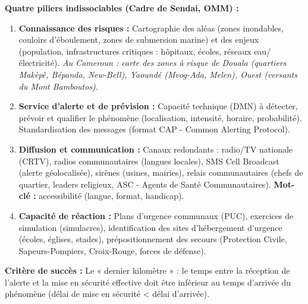\documentclass[11pt]{article}
\newcommand{\cle}[1]{{\popxbold\color{popdark}#1}}
\begin{document}
\begin{methode}
\textbf{Quatre piliers indissociables (Cadre de Sendai, OMM) :}
\begin{enumerate}
    \item \textbf{Connaissance des risques :} Cartographie des aléas (zones inondables, couloirs d'éboulement, zones de submersion marine) et des enjeux (population, infrastructures critiques : hôpitaux, écoles, réseaux eau/électricité). \emph{Au Cameroun : carte des zones à risque de Douala (quartiers Makèpè, Bépanda, New-Bell), Yaoundé (Mvog-Ada, Melen), Ouest (versants du Mont Bamboutos).}
    \item \textbf{Service d'alerte et de prévision :} Capacité technique (DMN) à détecter, prévoir et qualifier le phénomène (localisation, intensité, horaire, probabilité). Standardisation des messages (format CAP - Common Alerting Protocol).
    \item \textbf{Diffusion et communication :} Canaux redondants : radio/TV nationale (CRTV), radios communautaires (langues locales), SMS Cell Broadcast (alerte géolocalisée), sirènes (usines, mairies), relais communautaires (chefs de quartier, leaders religieux, ASC - Agents de Santé Communautaires). \textbf{Mot-clé :} \cle{accessibilité} (langue, format, handicap).
    \item \textbf{Capacité de réaction :} Plans d'urgence communaux (PUC), exercices de simulation (simulacres), identification des sites d'hébergement d'urgence (écoles, églises, stades), prépositionnement des secours (Protection Civile, Sapeurs-Pompiers, Croix-Rouge, forces de défense).
\end{enumerate}
\textbf{Critère de succès :} Le « dernier kilomètre » : le temps entre la réception de l'alerte et la mise en sécurité effective doit être inférieur au temps d'arrivée du phénomène (délai de mise en sécurité < délai d'arrivée).
\end{methode}
\end{document}
